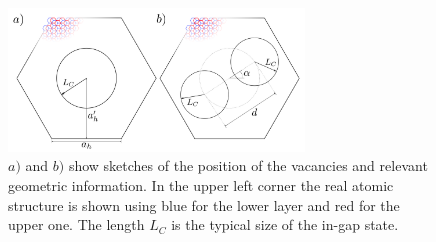 
\begin{figure}[h!]
\centering
\includegraphics[width=0.7\textwidth]{artlat/fig/vacs_sketch.pdf}
\vspace{-10pt}
\caption{$a)$ and $b)$ show sketches of the position of the vacancies and relevant geometric information. In the upper left corner the real atomic structure is shown using blue for the lower layer and red for the upper one. The length $L_C$ is the typical size of the in-gap state.} %
\label{geo_sketch}
\end{figure}
\FloatBarrier




